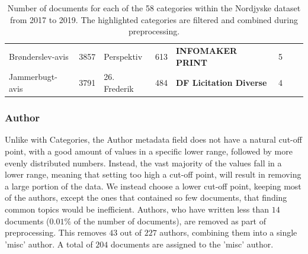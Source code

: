 \begin{table}[h]
\begin{tabular}{l|c|l|c|l|c|l|c}
		Brønderslev-avis    &  3857  & Perspektiv      &  613   & \textbf{INFOMAKER PRINT}       &   5    &                             &        \\
		Jammerbugt-avis     &  3791  & 26. Frederik    &  484   & \textbf{DF Licitation Diverse} &   4    &                             &        \\
		\bottomrule
	\end{tabular}
	\caption{Number of documents for each of the 58 categories within the Nordjyske dataset from 2017 to 2019.
		The highlighted categories are filtered and combined during preprocessing.}
	\label{tab:category_table}
\end{table}


\subsubsection{Author}\label{subsec:appendix_author}
Unlike with Categories, the Author metadata field does not have a natural cut-off point, with a good amount of values in a specific lower range, followed by more evenly distributed numbers.
Instead, the vast majority of the values fall in a lower range, meaning that setting too high a cut-off point, will result in removing a large portion of the data.
We instead choose a lower cut-off point, keeping most of the authors, except the ones that contained so few documents, that finding common topics would be inefficient.
Authors, who have written less than $14$ documents ($0.01\%$ of the number of documents), are removed as part of preprocessing.
This removes $43$ out of $227$ authors, combining them into a single 'misc' author.
A total of $204$ documents are assigned to the 'misc' author.


